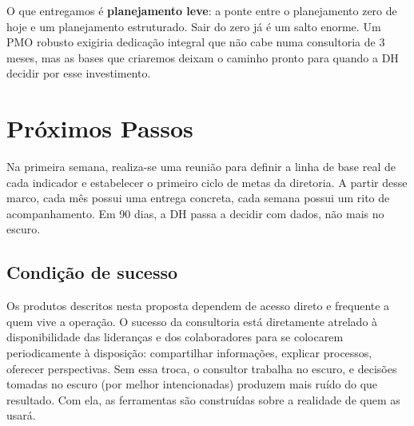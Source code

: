 \documentclass[12pt,a4paper]{scrartcl}
\begin{document}
O que entregamos é \textbf{planejamento leve}: a ponte entre o planejamento zero de hoje e um planejamento estruturado. Sair do zero já é um salto enorme. Um PMO robusto exigiria dedicação integral que não cabe numa consultoria de 3 meses, mas as bases que criaremos deixam o caminho pronto para quando a DH decidir por esse investimento.

\section{Próximos Passos}

Na primeira semana, realiza-se uma reunião para definir a linha de base real de cada indicador e estabelecer o primeiro ciclo de metas da diretoria. A partir desse marco, cada mês possui uma entrega concreta, cada semana possui um rito de acompanhamento. Em 90 dias, a DH passa a decidir com dados, não mais no escuro.

\subsection{Condição de sucesso}

Os produtos descritos nesta proposta dependem de acesso direto e frequente a quem vive a operação. O sucesso da consultoria está diretamente atrelado à disponibilidade das lideranças e dos colaboradores para se colocarem periodicamente à disposição: compartilhar informações, explicar processos, oferecer perspectivas. Sem essa troca, o consultor trabalha no escuro, e decisões tomadas no escuro (por melhor intencionadas) produzem mais ruído do que resultado. Com ela, as ferramentas são construídas sobre a realidade de quem as usará.
\end{document}
